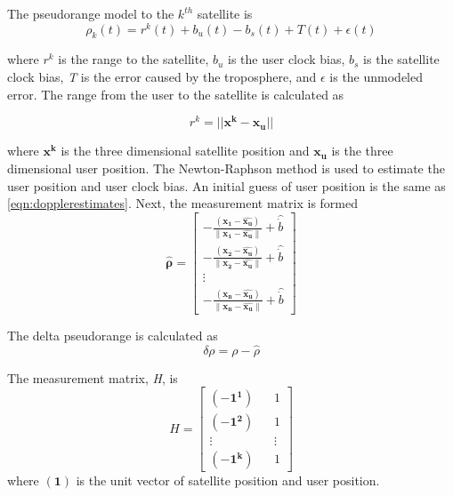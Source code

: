 \documentclass[12pt]{report}
\begin{document}
The pseudorange model to the $k^{th}$ satellite is 
\begin{equation}
    \rho_k(t) = r^k(t) + b_u(t) - b_s(t) + T(t) + \epsilon(t)
\end{equation}

where $r^k$ is the range to the satellite, $b_u$ is the user clock bias, $b_s$ is the satellite clock bias, \textit{T} is the error caused by the troposphere, and $\epsilon$ is the unmodeled error. The range from the user to the satellite is calculated as 

\begin{equation}
    r^k = || \mathbf{x^k - x_u}||
\end{equation}

where $\mathbf{x^k}$ is the three dimensional satellite position and $\mathbf{x_u}$ is the three dimensional user position. The Newton-Raphson method is used to estimate the user position and user clock bias. An initial guess of user position is the same as \ref{eqn:dopplerestimates}. 
Next, the measurement matrix is formed 
\begin{equation}
    \mathbf{\hat{\rho}} = \begin{bmatrix} 
        -\frac{(\mathbf{x_1} - \mathbf{\hat{x_u}})}{\| \mathbf{x_1} - \mathbf{\hat{x_u}}\|} + \hat{\dot{b}} \\ 
        -\frac{(\mathbf{x_2} - \mathbf{\hat{x_u}})}{\| \mathbf{x_2} - \mathbf{\hat{x_u}}\|} + \hat{\dot{b}} \\ 
        \vdots \\
        -\frac{(\mathbf{x_n} - \mathbf{\hat{x_u}})}{\| \mathbf{x_n} - \mathbf{\hat{x_u}}\|} + \hat{\dot{b}} 
    \end{bmatrix}
    \label{eqn:pseudorangeEstimate}
\end{equation}

The delta pseudorange is calculated as 
\begin{equation}
    \delta \rho = \rho - \hat{\rho}
    \label{eqn:deltapseudo}
\end{equation}

The measurement matrix, \textit{H}, is 
\begin{equation}
    H = \begin{bmatrix}
        (-\mathbf{1^1}) && 1 \\
        (-\mathbf{1^2}) && 1 \\
        \vdots && \vdots \\
        (-\mathbf{1^k}) && 1
    \end{bmatrix}
\end{equation}
where $\mathbf{(1)}$ is the unit vector of satellite position and user position. 
\end{document}
